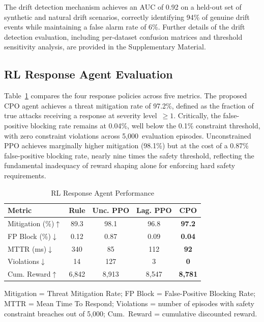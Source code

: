 \documentclass[journal]{IEEEtran}
\theoremstyle{definition}
\theoremstyle{remark}
\begin{document}
The drift detection mechanism achieves an AUC of 0.92 on a held-out set of synthetic and natural drift scenarios, correctly identifying 94\% of genuine drift events while maintaining a false alarm rate of 6\%. Further details of the drift detection evaluation, including per-dataset confusion matrices and threshold sensitivity analysis, are provided in the Supplementary Material.

\subsection{RL Response Agent Evaluation}
\label{subsec:rl_results}

Table~\ref{tab:rl_results} compares the four response policies across five metrics. The proposed CPO agent achieves a threat mitigation rate of 97.2\%, defined as the fraction of true attacks receiving a response at severity level~$\geq 1$. Critically, the false-positive blocking rate remains at 0.04\%, well below the 0.1\% constraint threshold, with zero constraint violations across 5{,}000~evaluation episodes. Unconstrained PPO achieves marginally higher mitigation (98.1\%) but at the cost of a 0.87\% false-positive blocking rate, nearly nine times the safety threshold, reflecting the fundamental inadequacy of reward shaping alone for enforcing hard safety requirements.

\begin{table}[!t]
\centering
\caption{RL Response Agent Performance}
\label{tab:rl_results}
\begin{threeparttable}
\begin{tabular}{@{}lcccc@{}}
\toprule
\textbf{Metric} & \textbf{Rule} & \textbf{Unc. PPO} & \textbf{Lag. PPO} & \textbf{CPO} \\
\midrule
Mitigation (\%)$\uparrow$ & 89.3 & 98.1 & 96.8 & \textbf{97.2} \\
FP Block (\%)$\downarrow$ & 0.12 & 0.87 & 0.09 & \textbf{0.04} \\
MTTR (ms)$\downarrow$ & 340 & 85 & 112 & \textbf{92} \\
Violations$\downarrow$ & 14 & 127 & 3 & \textbf{0} \\
Cum. Reward$\uparrow$ & 6{,}842 & 8{,}913 & 8{,}547 & \textbf{8{,}781} \\
\bottomrule
\end{tabular}
\begin{tablenotes}
\small
\item[] Mitigation = Threat Mitigation Rate; FP Block = False-Positive Blocking Rate; MTTR = Mean Time To Respond; Violations = number of episodes with safety constraint breaches out of 5{,}000; Cum.~Reward = cumulative discounted reward.
\end{tablenotes}
\end{threeparttable}
\end{table}
\end{document}
